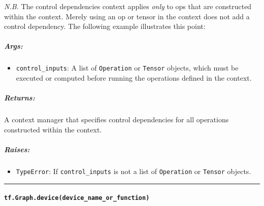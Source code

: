 \emph{N.B.} The control dependencies context applies \emph{only} to ops
that are constructed within the context. Merely using an op or tensor in
the context does not add a control dependency. The following example
illustrates this point:

\begin{Shaded}
\begin{Highlighting}[]
 
  \OperatorTok{=} 
   
     

 
   
     
\end{Highlighting}
\end{Shaded}

\subparagraph{Args: }\label{args-1}

\begin{itemize}
\tightlist
\item
  \lstinline{control_inputs}: A list of \lstinline{Operation} or
  \lstinline{Tensor} objects, which must be executed or computed before
  running the operations defined in the context.
\end{itemize}

\subparagraph{Returns: }\label{returns-2}

A context manager that specifies control dependencies for all operations
constructed within the context.

\subparagraph{Raises: }\label{raises}

\begin{itemize}
\tightlist
\item
  \lstinline{TypeError}: If \lstinline{control_inputs} is not a list of
  \lstinline{Operation} or \lstinline{Tensor} objects.
\end{itemize}

\begin{center}\rule{0.5\linewidth}{\linethickness}\end{center}

\paragraph{\texorpdfstring{\lstinline{tf.Graph.device(device_name_or_function)}
}{tf.Graph.device(device_name_or_function) }}\label{tf.graph.devicedeviceux5fnameux5forux5ffunction}

